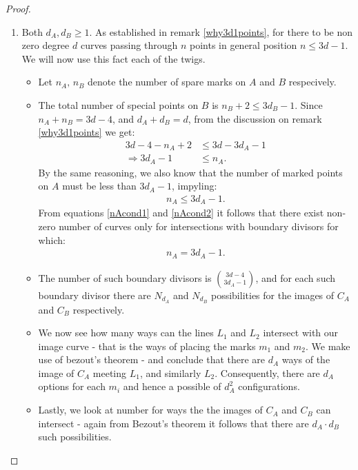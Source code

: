 \begin{proof}
\begin{enumerate}
    \item Both $d_{A}, d_{B} \geq 1$.
        As established in remark \ref{why3d1points}, for there to be non zero degree $d$ curves passing through $n$ points in general position $n \leq 3d-1$.
        We will now use this fact each of the twigs.
        \begin{itemize}
            \item Let $n_{A},\, n_{B}$ denote the number of spare marks on $A$ and $B$ respecively.
            \item The total number of special points on $B$ is $n_{B}+2 \leq 3d_{B} - 1$.
                Since $n_{A}+n_{B} = 3d-4$, and $d_{A} + d_{B} = d$, from the discussion on remark \ref{why3d1points} we get:
                \begin{align}
                    3d-4 - n_{A} +2 &\leq 3d - 3d_{A} -1 \\
                    \Rightarrow 3d_{A} - 1 &\leq n_{A}. \label{nAcond1}
                \end{align}
            By the same reasoning, we also know that the number of marked points on $A$ must be less than $3d_{A} - 1$, impyling:
                \begin{align}
                    n_{A} \leq 3d_{A} - 1. \label{nAcond2}
                \end{align}
            From equations \ref{nAcond1} and  \ref{nAcond2} it follows that there exist non-zero number of curves only for intersections with boundary divisors for which:
                \begin{align*}
                    n_{A} = 3d_{A} - 1.
                \end{align*}
            \item The number of such boundary divisors is $\binom{3d-4}{3d_{A}-1}$, and for each such boundary divisor there are $N_{d_{A}}$ and $N_{d_{B}}$ possibilities for the images of $C_{A}$ and $C_{B}$ respectively.
            \item We now see how many ways can the lines $L_{1}$ and $L_{2}$ intersect with our image curve - that is the ways of placing the marks $m_{1}$ and $m_{2}$.
                We make use of bezout's theorem - and conclude that there are $d_{A}$ ways of the image of $C_{A}$ meeting $L_{1}$, and similarly $L_{2}$.
                Consequently, there are $d_{A}$ options for each $m_{i}$ and hence a possible of $d_{A}^{2}$ configurations.
            \item Lastly, we look at number for ways the the images of $C_{A}$ and $C_{B}$ can intersect - again from Bezout's theorem it follows that there are $d_{A}\cdot d_{B}$ such possibilities.

\end{itemize}
\end{enumerate}
\end{proof}
